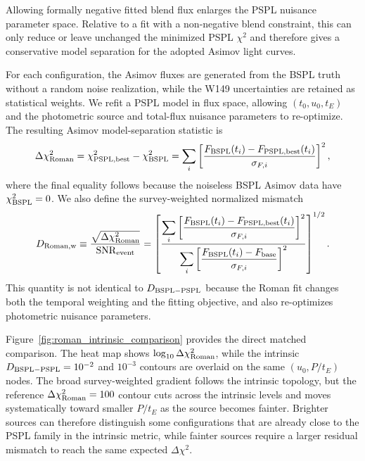\documentclass{article}
\begin{document}
Allowing formally negative fitted blend flux enlarges the PSPL nuisance
parameter space. Relative to a fit with a non-negative blend constraint,
this can only reduce or leave unchanged the minimized PSPL $\chi^2$ and
therefore gives a conservative model separation for the adopted Asimov
light curves.

For each configuration, the Asimov fluxes are generated from the BSPL
truth without a random noise realization, while the W149 uncertainties
are retained as statistical weights. We refit a PSPL model in flux space,
allowing $(t_0,u_0,t_E)$ and the photometric source and total-flux nuisance
parameters to re-optimize. The resulting Asimov model-separation statistic
is
\begin{equation}
\Delta\chi^2_{\rm Roman}
=
\chi^2_{\rm PSPL,best}-\chi^2_{\rm BSPL}
=
\sum_i
\left[
\frac{F_{\rm BSPL}(t_i)-F_{\rm PSPL,best}(t_i)}{\sigma_{F,i}}
\right]^2,
\label{eq:roman_dchi2}
\end{equation}
where the final equality follows because the noiseless BSPL Asimov data
have $\chi^2_{\rm BSPL}=0$. We also define the survey-weighted normalized
mismatch
\begin{equation}
D_{\rm Roman,w}
\equiv
\frac{\sqrt{\Delta\chi^2_{\rm Roman}}}{{\rm SNR}_{\rm event}}
=
\left[
\frac{
\displaystyle\sum_i
\left[
\frac{F_{\rm BSPL}(t_i)-F_{\rm PSPL,best}(t_i)}{\sigma_{F,i}}
\right]^2
}{
\displaystyle\sum_i
\left[
\frac{F_{\rm BSPL}(t_i)-F_{\rm base}}{\sigma_{F,i}}
\right]^2
}
\right]^{1/2}.
\label{eq:D_roman}
\end{equation}
This quantity is not identical to $D_{\rm BSPL-PSPL}$ because the Roman
fit changes both the temporal weighting and the fitting objective, and
also re-optimizes photometric nuisance parameters.

Figure~\ref{fig:roman_intrinsic_comparison} provides the direct matched
comparison. The heat map shows $\log_{10}\Delta\chi^2_{\rm Roman}$,
while the intrinsic $D_{\rm BSPL-PSPL}=10^{-2}$ and $10^{-3}$ contours
are overlaid on the same $(u_0,P/t_E)$ nodes. The broad survey-weighted
gradient follows the intrinsic topology, but the reference
$\Delta\chi^2_{\rm Roman}=100$ contour cuts across the intrinsic levels
and moves systematically toward smaller $P/t_E$ as the source becomes
fainter. Brighter sources can therefore distinguish some configurations
that are already close to the PSPL family in the intrinsic metric, while
fainter sources require a larger residual mismatch to reach the same
expected $\Delta\chi^2$.
\end{document}
